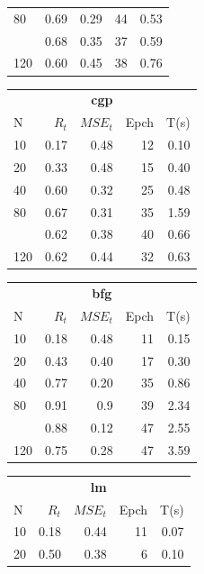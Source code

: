 \documentclass[a4paper, 10pt]{article}
\begin{document}
\begin{table}[h!]
\begin{tabular}{@{}lrrrr@{}}
    80  & 0.69    & 0.29    & 44      &  0.53  \\
    \hdashline
   100  & 0.68    & 0.35    & 37      &  0.59  \\
   120  & 0.60    & 0.45    & 38      &  0.76  \\
    \bottomrule
  \end{tabular} 
  \mbox{}
  \begin{tabular}{@{}lrrrr@{}}
    \toprule
    \multicolumn{5}{c}{\textbf{cgp}} \\
    N  &   $R_t$  &  $MSE_t$ &  Epch  & T(s)\\
    \midrule
    10  & 0.17    & 0.48    & 12      &  0.10  \\
    20  & 0.33    & 0.48    & 15      &  0.40  \\
    40  & 0.60    & 0.32    & 25      &  0.48  \\
    80  & 0.67    & 0.31    & 35      &  1.59  \\
    \hdashline
   100  & 0.62    & 0.38    & 40      &  0.66  \\
   120  & 0.62    & 0.44    & 32      &  0.63  \\
    \bottomrule
  \end{tabular} 
  \hfill
  \begin{tabular}{@{}lrrrr@{}}
    \toprule
    \multicolumn{5}{c}{\textbf{bfg}} \\
    N  &   $R_t$  &  $MSE_t$ &  Epch  & T(s)\\
    \midrule
    10  & 0.18    & 0.48   & 11       & 0.15  \\
    20  & 0.43    & 0.40   & 17       & 0.30  \\
    40  & 0.77    & 0.20   & 35       & 0.86  \\
    80  & 0.91    & 0.9    & 39       & 2.34  \\
    \hdashline
   100  & 0.88    & 0.12   & 47       & 2.55  \\   
   120  & 0.75    & 0.28   & 47       & 3.59  \\
    \bottomrule
  \end{tabular} 
  \hfill
  \begin{tabular}{@{}lrrrr@{}}
    \toprule
    \multicolumn{5}{c}{\textbf{lm}} \\
    N  &   $R_t$  &  $MSE_t$ &  Epch  & T(s)\\
    \midrule
    10  & 0.18    & 0.44   & 11       & 0.07  \\ 
    20  & 0.50    & 0.38   &  6       & 0.10  \\ 

\end{tabular}
\end{table}
\end{document}
